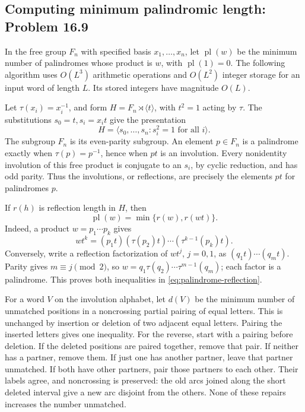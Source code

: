 \subsection{Computing minimum palindromic length: Problem 16.9}
\label{cand:16.9}

In the free group \(F_n\) with specified basis \(x_1,\ldots,x_n\),
let \(\operatorname{pl}(w)\) be the minimum number of palindromes
whose product is \(w\), with \(\operatorname{pl}(1)=0\).
The following algorithm uses \(O(L^3)\) arithmetic operations
and \(O(L^2)\) integer storage for an input word of length \(L\).
Its stored integers have magnitude \(O(L)\).

Let \(\tau(x_i)=x_i^{-1}\), and form
\(H=F_n\rtimes\langle t\rangle\), with \(t^2=1\)
acting by \(\tau\). The substitutions \(s_0=t,s_i=x_it\)
give the presentation
\[
 H=\langle s_0,\ldots,s_n:s_i^2=1\text{ for all }i\rangle.
\]
The subgroup \(F_n\) is its even-parity subgroup.
An element \(p\in F_n\) is a palindrome exactly when
\(\tau(p)=p^{-1}\), hence when \(pt\) is an involution.
Every nonidentity involution of this free product
is conjugate to an \(s_i\), by cyclic reduction,
and has odd parity. Thus the involutions, or
reflections, are precisely the elements \(pt\)
for palindromes \(p\).

If \(r(h)\) is reflection length in \(H\), then
\begin{equation}\label{eq:palindrome-reflection}
 \operatorname{pl}(w)=\min\{r(w),r(wt)\}.
\end{equation}
Indeed, a product \(w=p_1\cdots p_k\) gives
\[
 wt^k=(p_1t)(\tau(p_2)t)\cdots
                   (\tau^{k-1}(p_k)t).
\]
Conversely, write a reflection factorization of
\(wt^j\), \(j=0,1\), as
\((q_1t)\cdots(q_mt)\). Parity gives \(m\equiv j\pmod2\),
so
\(w=q_1\tau(q_2)\cdots\tau^{m-1}(q_m)\);
each factor is a palindrome. This proves both
inequalities in \eqref{eq:palindrome-reflection}.

For a word \(V\) on the involution alphabet, let
\(d(V)\) be the minimum number of unmatched positions
in a noncrossing partial pairing of equal letters.
This is unchanged by insertion or deletion of two
adjacent equal letters. Pairing the inserted letters
gives one inequality. For the reverse, start with
a pairing before deletion. If the deleted positions
are paired together, remove that pair. If neither
has a partner, remove them. If just one has another
partner, leave that partner unmatched. If both have
other partners, pair those partners to each other.
Their labels agree, and noncrossing is preserved:
the old arcs joined along the short deleted interval
give a new arc disjoint from the others. None of
these repairs increases the number unmatched.

